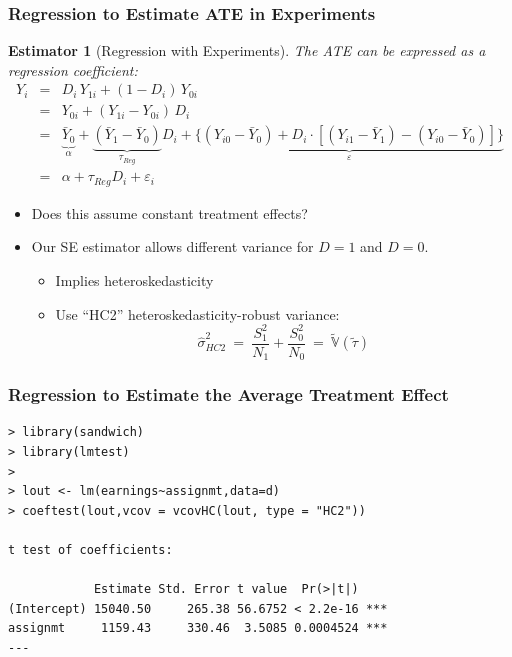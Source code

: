 \documentclass[xcolor=dvipsnames]{beamer}
\renewcommand{\epsilon}{\varepsilon}
\newcommand\V{\mathbb{V}}
\newtheorem{esti}{Estimator}
\begin{document}
\begin{frame}
  \frametitle{Regression to Estimate ATE in Experiments}
\small
\begin{esti}[Regression with Experiments]\small
The ATE can be expressed as a regression coefficient:
\begin{eqnarray*}
  Y_i &=& D_i\, Y_{1i} + (1-D_i)\, Y_{0i} \\
   &=& Y_{0i} + (Y_{1i}- Y_{0i})\,D_i \\
   &=& \underbrace{\bar Y_0}_{\alpha} + \underbrace{(\bar Y_1 - \bar Y_0)}_{\tau_{Reg}} D_i + \underbrace{\{(Y_{i0} - \bar Y_0) + D_i \cdot [(Y_{i1} - \bar Y_1) - (Y_{i0} - \bar Y_0)] \}}_{\epsilon} \\
   &=& \alpha + \tau_{Reg} D_i + \epsilon_i
\end{eqnarray*}
\end{esti}\vspace{-.2in}
\bigskip
\begin{itemize}
\footnotesize
\item<2-> Does this assume constant treatment effects?
\item<3-> Our SE estimator allows different variance for $D=1$ and $D=0$.
  \begin{itemize}
\scriptsize
  \item  Implies heteroskedasticity
  \item Use ``HC2'' heteroskedasticity-robust variance:
  $$ \hat\sigma^2_{HC2} \ = \ \frac{S_1^2}{N_1} + \frac{S_0^2}{N_0} \ = \ \tilde{\V}(\tilde\tau) $$
  \end{itemize}
\end{itemize}
\end{frame}


\begin{frame}[fragile]
\frametitle{Regression to Estimate the Average Treatment Effect}
{
\footnotesize
\begin{Verbatim}[frame=single, label=R Code, commandchars=\\\{\}]
> library(sandwich)
> library(lmtest)
>
> lout <- lm(earnings~assignmt,data=d)
> coeftest(lout,vcov = vcovHC(lout, type = "HC2"))

t test of coefficients:

            Estimate Std. Error t value  Pr(>|t|)
(Intercept) 15040.50     265.38 56.6752 < 2.2e-16 ***
assignmt     1159.43     330.46  3.5085 0.0004524 ***
---
\end{Verbatim}
}
\end{frame}
\end{document}
